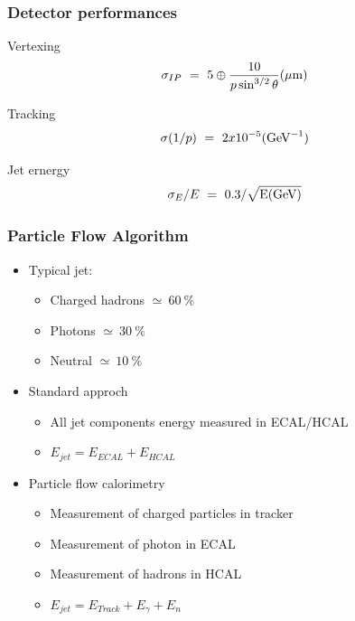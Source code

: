\documentclass{beamer}
\begin{document}
  \begin{frame}[plain]
    \frametitle{Detector performances}

    \begin{block}{Vertexing}
      \[ \sigma_{IP} \ = \ 5 \oplus \frac{10}{p\sin^{3/2}\theta} (\mu\rm{m})\]
    \end{block}

    \begin{block}{Tracking}
      \[ \sigma (1/p) \ = \ 2x10^{-5} (\rm{GeV}^{-1})\]
    \end{block}
      
    \begin{block}{Jet ernergy}
      \[\sigma_E / E \ = \ 0.3/\sqrt{\rm{E(GeV)}}\]
    \end{block}

  \end{frame}

  \begin{frame}[plain]
    \frametitle{Particle Flow Algorithm}

    \begin{itemize}
      \item Typical jet:
        \begin{itemize}
          \item Charged hadrons $\simeq~60~\%$
          \item Photons $\simeq~30~\%$
          \item Neutral $\simeq~10~\%$
        \end{itemize}
      \item Standard approch
        \begin{itemize}
          \item All jet components energy measured in ECAL/HCAL
          \item $E_{jet} = E_{ECAL} + E_{HCAL}$
        \end{itemize}
      \item Particle flow calorimetry
        \begin{itemize}
          \item Measurement of charged particles in tracker
          \item Measurement of photon in ECAL
          \item Measurement of hadrons in HCAL
          \item $E_{jet} = E_{Track} + E_{\gamma} + E_n$
        \end{itemize}
    \end{itemize}
  \end{frame}
\end{document}
